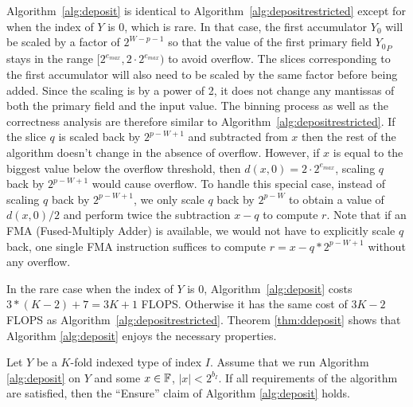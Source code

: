       Algorithm~\ref{alg:deposit} is identical to Algorithm~\ref{alg:depositrestricted} except
      for when the index of $Y$ is $0$, which is rare.
      In that case, the first accumulator $Y_0$ will be scaled by a factor of $2^{W-p-1}$
      so that the value of the first primary field ${Y_0}_P$ stays in the range
      $[2^{e_{max}}, 2 \cdot 2^{e_{max}})$ to avoid overflow.
      The slices corresponding to the first accumulator will also need to be scaled
      by the same factor before being added.
      Since the scaling is by a power of 2, it does not change any mantissas
      of both the primary field and the input value.
      The binning process as well as the correctness analysis
      are therefore similar to Algorithm~\ref{alg:depositrestricted}.
      If the slice $q$ is scaled back by $2^{p-W+1}$ and subtracted from $x$
      then the rest of the algorithm doesn't change in the absence of overflow.
      However, if $x$ is equal to the biggest value below the overflow threshold,
      then $d(x,0) = 2\cdot 2^{e_{max}}$,
      scaling $q$ back by $2^{p-W+1}$ would cause overflow.
      To handle this special case, instead of scaling $q$ back by $2^{p-W+1}$,
      we only scale $q$ back by $2^{p-W}$ to obtain a value of $d(x,0)/2$
      and perform twice the subtraction $x-q$ to compute $r$.
      Note that if an FMA (Fused-Multiply Adder) is available,
      we would not have to explicitly scale $q$ back,
      one single FMA instruction suffices to compute $r = x - q * 2^{p-W+1}$
      without any overflow.

      In the rare case when the index of $Y$ is 0, Algorithm~\ref{alg:deposit}
      costs $3 * (K-2) + 7 = 3K+1$ FLOPS. Otherwise it has the same cost
      of $3K-2$ FLOPS as Algorithm~\ref{alg:depositrestricted}.
      Theorem \ref{thm:ddeposit} shows that Algorithm \ref{alg:deposit}
      enjoys the necessary properties.

      \begin{samepage}
      \begin{thm}
        Let $Y$ be a $K$-fold indexed type of index $I$. Assume that we run
        Algorithm \ref{alg:deposit} on $Y$ and some $x \in \mathbb{F}$, $|x|<2^{b_I}$.
        If all requirements of the algorithm are satisfied, then the
        ``Ensure'' claim of Algorithm \ref{alg:deposit} holds.
        \label{thm:ddeposit}
      \end{thm}
    \end{samepage}

